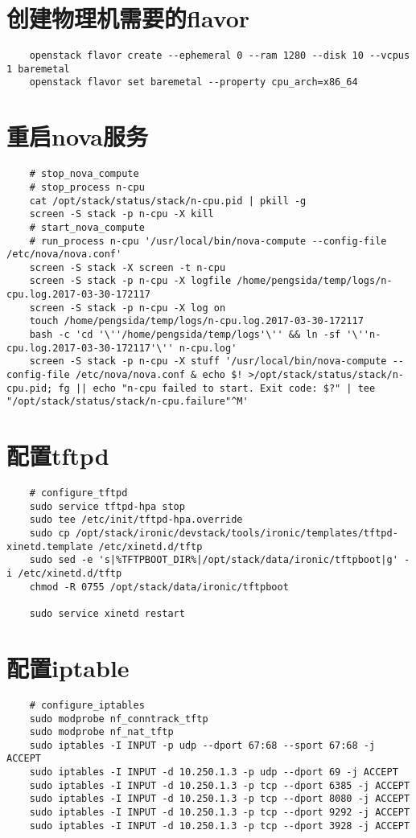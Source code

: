 \documentclass[a4paper,left=1.5cm,right=1.5cm,11pt]{article}
\begin{document}
\section{创建物理机需要的flavor}
	\begin{lstlisting}
	openstack flavor create --ephemeral 0 --ram 1280 --disk 10 --vcpus 1 baremetal
	openstack flavor set baremetal --property cpu_arch=x86_64	
	\end{lstlisting}

\section{重启nova服务}
	\begin{lstlisting}
	# stop_nova_compute
	# stop_process n-cpu
	cat /opt/stack/status/stack/n-cpu.pid | pkill -g
	screen -S stack -p n-cpu -X kill
	# start_nova_compute
	# run_process n-cpu '/usr/local/bin/nova-compute --config-file /etc/nova/nova.conf'
	screen -S stack -X screen -t n-cpu
	screen -S stack -p n-cpu -X logfile /home/pengsida/temp/logs/n-cpu.log.2017-03-30-172117
	screen -S stack -p n-cpu -X log on
	touch /home/pengsida/temp/logs/n-cpu.log.2017-03-30-172117
	bash -c 'cd '\''/home/pengsida/temp/logs'\'' && ln -sf '\''n-cpu.log.2017-03-30-172117'\'' n-cpu.log'
	screen -S stack -p n-cpu -X stuff '/usr/local/bin/nova-compute --config-file /etc/nova/nova.conf & echo $! >/opt/stack/status/stack/n-cpu.pid; fg || echo "n-cpu failed to start. Exit code: $?" | tee "/opt/stack/status/stack/n-cpu.failure"^M'	
	\end{lstlisting}

\section{配置tftpd}
	\begin{lstlisting}
	# configure_tftpd
	sudo service tftpd-hpa stop
	sudo tee /etc/init/tftpd-hpa.override
	sudo cp /opt/stack/ironic/devstack/tools/ironic/templates/tftpd-xinetd.template /etc/xinetd.d/tftp
	sudo sed -e 's|%TFTPBOOT_DIR%|/opt/stack/data/ironic/tftpboot|g' -i /etc/xinetd.d/tftp
	chmod -R 0755 /opt/stack/data/ironic/tftpboot
	
	sudo service xinetd restart
	\end{lstlisting}

\section{配置iptable}
	\begin{lstlisting}
	# configure_iptables
	sudo modprobe nf_conntrack_tftp
	sudo modprobe nf_nat_tftp
	sudo iptables -I INPUT -p udp --dport 67:68 --sport 67:68 -j ACCEPT
	sudo iptables -I INPUT -d 10.250.1.3 -p udp --dport 69 -j ACCEPT
	sudo iptables -I INPUT -d 10.250.1.3 -p tcp --dport 6385 -j ACCEPT
	sudo iptables -I INPUT -d 10.250.1.3 -p tcp --dport 8080 -j ACCEPT
	sudo iptables -I INPUT -d 10.250.1.3 -p tcp --dport 9292 -j ACCEPT
	sudo iptables -I INPUT -d 10.250.1.3 -p tcp --dport 3928 -j ACCEPT
	\end{lstlisting}
	
\end{document}
